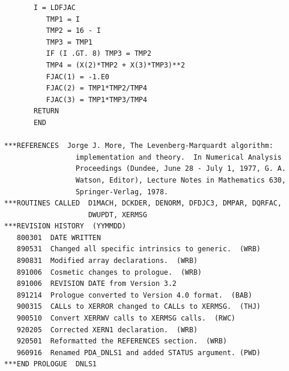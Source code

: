 \documentclass[11pt,twoside]{article}
\begin{document}
\begin{verbatim}
       I = LDFJAC
          TMP1 = I
          TMP2 = 16 - I
          TMP3 = TMP1
          IF (I .GT. 8) TMP3 = TMP2
          TMP4 = (X(2)*TMP2 + X(3)*TMP3)**2
          FJAC(1) = -1.E0
          FJAC(2) = TMP1*TMP2/TMP4
          FJAC(3) = TMP1*TMP3/TMP4
       RETURN
       END

***REFERENCES  Jorge J. More, The Levenberg-Marquardt algorithm:
                 implementation and theory.  In Numerical Analysis
                 Proceedings (Dundee, June 28 - July 1, 1977, G. A.
                 Watson, Editor), Lecture Notes in Mathematics 630,
                 Springer-Verlag, 1978.
***ROUTINES CALLED  D1MACH, DCKDER, DENORM, DFDJC3, DMPAR, DQRFAC,
                    DWUPDT, XERMSG
***REVISION HISTORY  (YYMMDD)
   800301  DATE WRITTEN
   890531  Changed all specific intrinsics to generic.  (WRB)
   890831  Modified array declarations.  (WRB)
   891006  Cosmetic changes to prologue.  (WRB)
   891006  REVISION DATE from Version 3.2
   891214  Prologue converted to Version 4.0 format.  (BAB)
   900315  CALLs to XERROR changed to CALLs to XERMSG.  (THJ)
   900510  Convert XERRWV calls to XERMSG calls.  (RWC)
   920205  Corrected XERN1 declaration.  (WRB)
   920501  Reformatted the REFERENCES section.  (WRB)
   960916  Renamed PDA_DNLS1 and added STATUS argument. (PWD)
***END PROLOGUE  DNLS1
\end{verbatim}
\end{document}
